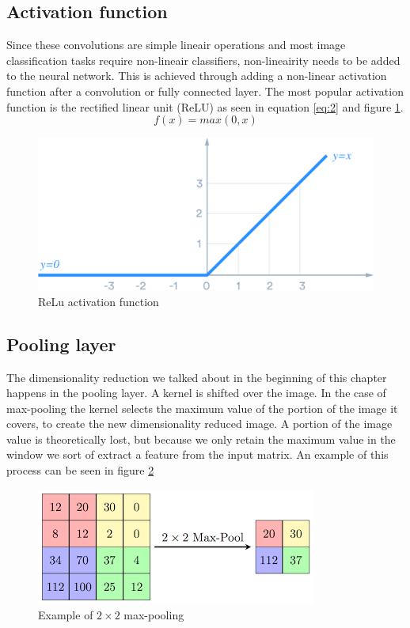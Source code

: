\subsection{Activation function}
Since these convolutions are simple lineair operations and most image classification tasks require non-lineair classifiers, non-lineairity needs to be added to the neural network. This is achieved through adding a non-linear activation function after a convolution or fully connected layer. The most popular activation function is the rectified linear unit (ReLU) as seen in equation \ref{eq:2} and figure \ref{fig:relu}.
\begin{equation} \label{eq:2}
  f(x)=max(0,x)
\end{equation}

\begin{figure}[H]
  \includegraphics[width=\linewidth]{plots/relu.png}
  \caption{ReLu activation function}
  \label{fig:relu}
\end{figure}

\subsection{Pooling layer}
The dimensionality reduction we talked about in the beginning of this chapter happens in the pooling layer. A kernel is shifted over the image. In the case of max-pooling the kernel selects the maximum value of the portion of the image it covers, to create the new dimensionality reduced image. A portion of the image value is theoretically lost, but because we only retain the maximum value in the window we sort of extract a feature from the input matrix. An example of this process can be seen in figure \ref{fig:pooling}
\begin{figure}[H]
  \includegraphics[width=\linewidth]{fig/maxpool.png}
  \caption{Example of $2\times2$ max-pooling}
  \label{fig:pooling}
\end{figure}

